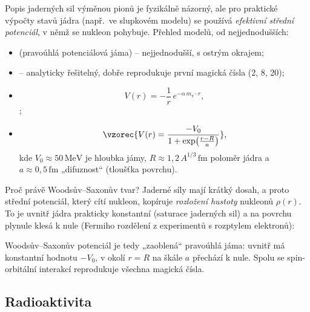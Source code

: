 Popis jaderných sil výměnou pionů je fyzikálně názorný, ale pro praktické výpočty stavů jádra (např.\ ve slupkovém
modelu) se používá \emph{efektivní střední potenciál}, v němž se nukleon pohybuje. Přehled modelů, od nejjednodušších:
\begin{itemize}
  \item {} (pravoúhlá potenciálová jáma) -- nejjednodušší, s ostrým okrajem;
  \item {} -- analyticky řešitelný, dobře reprodukuje první magická čísla (2, 8, 20);
\end{itemize}
\begin{itemize}
  \item {}
  \[
    V(r) = -\frac{1}{r}\, e^{-\alpha\, m_\pi \cdot r},
  \]
  ;
  \item {}
  \[
    \vzorec{V(r) = \frac{-V_0}{1+\exp\!\left(\frac{r-R}{a}\right)}} ,
  \]
  kde \(V_0\approx 50\,\mathrm{MeV}\) je hloubka jámy, \(R \approx 1{,}2\,A^{1/3}\,\mathrm{fm}\) poloměr jádra
  a \(a\approx 0{,}5\,\mathrm{fm}\) „difuznost“ (tloušťka povrchu).
\end{itemize}
Proč právě Woodsův--Saxonův tvar? Jaderné síly mají krátký dosah, a proto střední potenciál, který cítí nukleon,
kopíruje \emph{rozložení hustoty} nukleonů \(\rho(r)\). To je uvnitř jádra prakticky konstantní (saturace jaderných sil)
a na povrchu plynule klesá k nule (Fermiho rozdělení z experimentů s rozptylem elektronů):

\begin{center}
\end{center}

Woodsův--Saxonův potenciál je tedy „zaoblená“ pravoúhlá jáma: uvnitř má konstantní hodnotu \(-V_0\), v okolí
\(r=R\) na škále \(a\) přechází k nule. Spolu se spin-orbitální interakcí reprodukuje všechna magická čísla.

\subsection{Radioaktivita}

